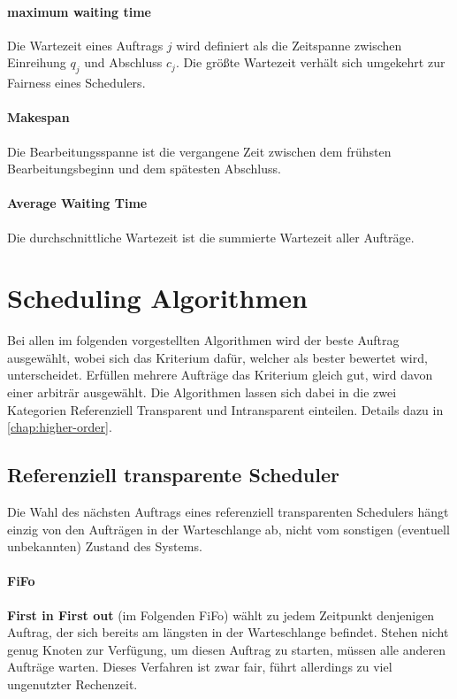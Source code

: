 \paragraph{maximum waiting time}
Die Wartezeit eines Auftrags $j$ wird definiert als die Zeitspanne zwischen Einreihung $q_j$ und Abschluss $c_j$. Die größte Wartezeit verhält sich umgekehrt zur Fairness eines Schedulers.

\paragraph{Makespan}
Die Bearbeitungsspanne ist die vergangene Zeit zwischen dem frühsten Bearbeitungsbeginn und dem spätesten Abschluss.

\paragraph{Average Waiting Time}
Die durchschnittliche Wartezeit ist die summierte Wartezeit aller Aufträge.

\section{Scheduling Algorithmen}
Bei allen im folgenden vorgestellten Algorithmen wird der beste Auftrag ausgewählt, wobei sich das Kriterium dafür, welcher als bester bewertet wird, unterscheidet. Erfüllen mehrere Aufträge das Kriterium gleich gut, wird davon einer arbiträr ausgewählt. Die Algorithmen lassen sich dabei in die zwei Kategorien   Referenziell Transparent und Intransparent einteilen. Details dazu in \ref{chap:higher-order}.

\subsection{Referenziell transparente Scheduler}
Die Wahl des nächsten Auftrags eines referenziell transparenten Schedulers hängt einzig von den Aufträgen in der Warteschlange ab, nicht vom sonstigen (eventuell unbekannten) Zustand des Systems.

\paragraph{FiFo}
\textbf{First in First out} (im Folgenden FiFo) wählt zu jedem Zeitpunkt denjenigen Auftrag, der sich bereits am längsten in der Warteschlange befindet. Stehen nicht genug Knoten zur Verfügung, um diesen Auftrag zu starten, müssen alle anderen Aufträge warten. Dieses Verfahren ist zwar fair, führt allerdings zu viel ungenutzter Rechenzeit.

